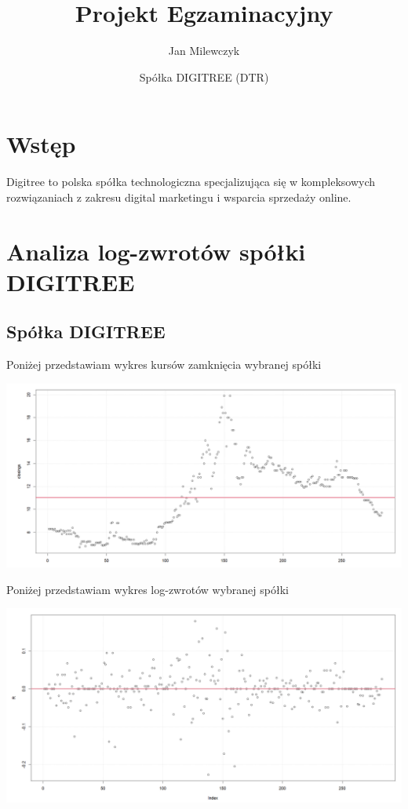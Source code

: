 \documentclass[a4paper,11pt]{article}
\title{Projekt Egzaminacyjny}
\author{Jan Milewczyk}
\date{Spółka DIGITREE (DTR)}
\begin{document}
\maketitle

\section{Wstęp}
Digitree to polska spółka technologiczna specjalizująca się w kompleksowych rozwiązaniach z zakresu digital marketingu i wsparcia sprzedaży online.


\section{Analiza log-zwrotów spółki DIGITREE}

\subsection{Spółka DIGITREE}
Poniżej przedstawiam wykres kursów zamknięcia wybranej spółki

\centerline{\includegraphics[width=14cm]{zamkniecie.png}}

Poniżej przedstawiam wykres log-zwrotów wybranej spółki

\centerline{\includegraphics[width=14cm]{logzwroty.png}}
\end{document}
